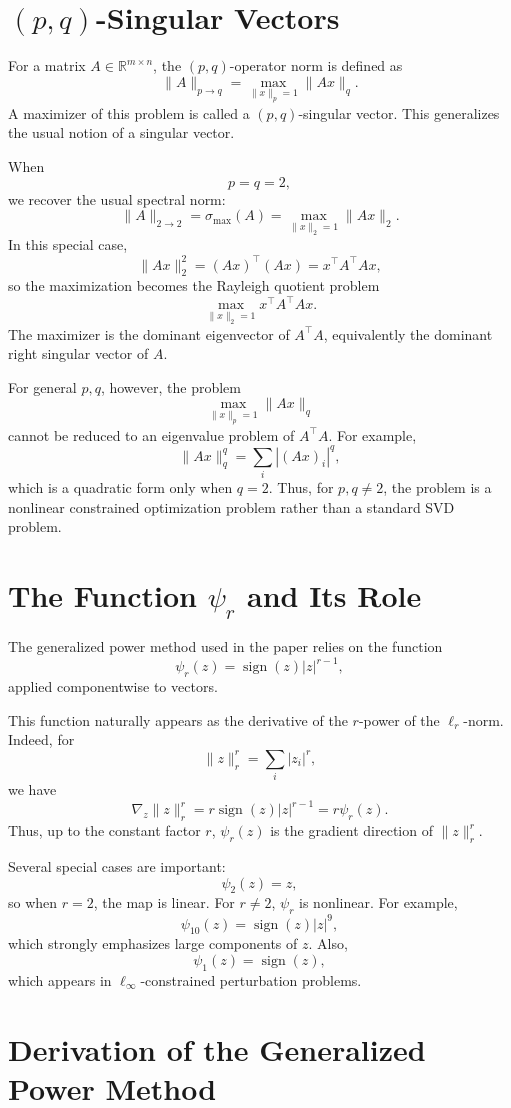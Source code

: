 \documentclass{article}
\begin{document}
\section{\((p,q)\)-Singular Vectors}

For a matrix \(A\in\mathbb{R}^{m\times n}\), the \((p,q)\)-operator norm is defined as
\[
\|A\|_{p\to q}
=
\max_{\|x\|_p=1}\|Ax\|_q.
\]
A maximizer of this problem is called a \((p,q)\)-singular vector. This generalizes the usual notion of a singular vector.

When
\[
p=q=2,
\]
we recover the usual spectral norm:
\[
\|A\|_{2\to 2}
=
\sigma_{\max}(A)
=
\max_{\|x\|_2=1}\|Ax\|_2.
\]
In this special case,
\[
\|Ax\|_2^2
=
(Ax)^\top(Ax)
=
x^\top A^\top A x,
\]
so the maximization becomes the Rayleigh quotient problem
\[
\max_{\|x\|_2=1}x^\top A^\top A x.
\]
The maximizer is the dominant eigenvector of \(A^\top A\), equivalently the dominant right singular vector of \(A\).

For general \(p,q\), however, the problem
\[
\max_{\|x\|_p=1}\|Ax\|_q
\]
cannot be reduced to an eigenvalue problem of \(A^\top A\). For example,
\[
\|Ax\|_q^q
=
\sum_i |(Ax)_i|^q,
\]
which is a quadratic form only when \(q=2\). Thus, for \(p,q\neq 2\), the problem is a nonlinear constrained optimization problem rather than a standard SVD problem.

\section{The Function \(\psi_r\) and Its Role}

The generalized power method used in the paper relies on the function
\[
\psi_r(z)
=
\operatorname{sign}(z)|z|^{r-1},
\]
applied componentwise to vectors.

This function naturally appears as the derivative of the \(r\)-power of the \(\ell_r\)-norm. Indeed, for
\[
\|z\|_r^r
=
\sum_i |z_i|^r,
\]
we have
\[
\nabla_z \|z\|_r^r
=
r\operatorname{sign}(z)|z|^{r-1}
=
r\psi_r(z).
\]
Thus, up to the constant factor \(r\), \(\psi_r(z)\) is the gradient direction of \(\|z\|_r^r\).

Several special cases are important:
\[
\psi_2(z)=z,
\]
so when \(r=2\), the map is linear. For \(r\neq 2\), \(\psi_r\) is nonlinear. For example,
\[
\psi_{10}(z)
=
\operatorname{sign}(z)|z|^9,
\]
which strongly emphasizes large components of \(z\). Also,
\[
\psi_1(z)=\operatorname{sign}(z),
\]
which appears in \(\ell_\infty\)-constrained perturbation problems.

\section{Derivation of the Generalized Power Method}
\end{document}
